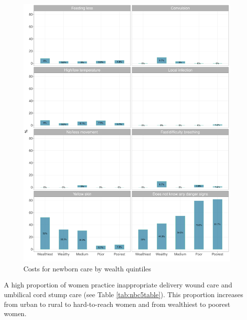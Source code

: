\documentclass[12pt,a4paper]{article}
\begin{document}
\begin{figure}[H]

{\centering \includegraphics{kayahReport_files/figure-latex/nbc8Plot-1} 

}

\caption{Costs for newborn care by wealth quintiles}\label{fig:nbc8Plot}
\end{figure}

\newpage

A high proportion of women practice inappropriate delivery wound care and umbilical cord stump care (see Table \ref{tab:nbc5table}). This proportion increases from urban to rural to hard-to-reach women and from wealthiest to poorest women.
\end{document}
